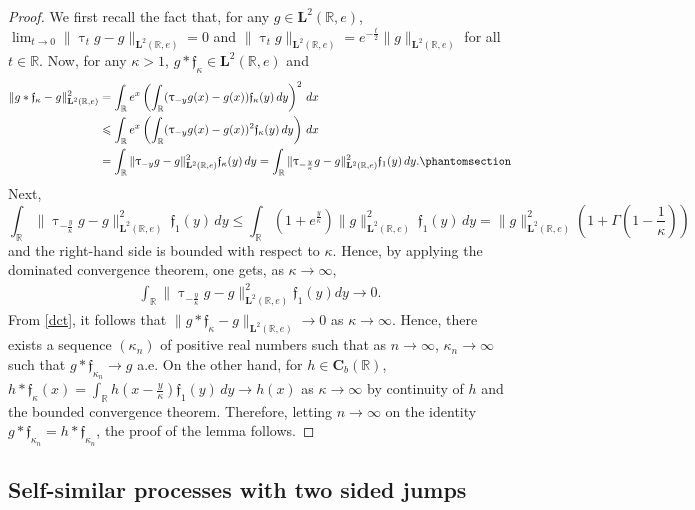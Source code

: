 \documentclass[12pt]{amsart}
\newcommand{\hlabel}{\phantomsection\label}
\numberwithin{equation}{section}
\newcommand{\bb}{\mathbb}
\renewcommand{\le}{\leqslant}
\newcommand{\hpt}[2]{#2}
\newcommand{\mf}{\mathfrak}
\newcommand{\bmrm}[2][2]{\mathbf{#2}^{#1}}
\newcommand{\C}{\mathbf{C}}
\newcommand{\LRe}{\bmrm{L}(\bb{R},e)}
\renewcommand{\tau}{\uptau}
\theoremstyle{definition}
\theoremstyle{assump}
\theoremstyle{remark}
\begin{document}
{\begin{proof}
We first recall the fact that, for any $g\in\bmrm{L}(\bb{R},e)$, $\lim_{t\to 0}\|\tau_tg-g\|_{\bmrm{L}(\bb R,e)}=0$ and $\hpt{R38}{\|\tau_t g\|_{\bmrm{L}(\bb{R},e)}=e^{-\frac{t}{2}}\|g\|_{\bmrm{L}(\bb{R},e)}}$ for all $t\in\bb{R}$. Now, for any $\kappa>1$, $g\ast\mf{f}_\kappa\in\bmrm{L}(\bb{R},e)$ and
\begin{align}
\|g\ast\mf{f}_\kappa-g\|^2_{\LRe}&=\int_\bb{R} e^x\left(\int_\bb{R}(\tau_{-y}g(x)-g(x))\mf{f}_\kappa(y)\,dy\right)^2\,dx \nonumber \\
&\le\int_\bb{R} e^x\left(\int_\bb{R}(\tau_{-y}g(x)-g(x))^2\mf{f}_\kappa(y)\,dy\right)\,dx \nonumber \\
&=\int_{\bb{R}}\|\tau_{-y}g-g\|^2_{\LRe}\mf{f}_\kappa(y)\,dy=\int_{\bb{R}}\|\tau_{-\frac{y}{\kappa}}g-g\|^2_{\LRe}\mf{f}_1(y)\,dy. \hlabel{dct}
\end{align}
Next,
$$\int_\bb{R}\|\tau_{-\frac{y}{\kappa}}g-g\|^2_{\LRe}\ \mf{f}_1(y)\,dy\le\int_\bb{R}(1+e^{\frac{y}{\kappa}})\|g\|^2_{\LRe}\ \mf{f}_1(y)\,dy=\|g\|^2_{\LRe}\left(1+\Gamma\left(1-\frac{1}{\kappa}\right)\right)$$
and the right-hand side is bounded with respect to $\kappa$. Hence, by applying the dominated convergence theorem, one gets,  as $\kappa\to\infty$,
\begin{align*}
\int_\bb{R} \|\tau_{-\frac{y}{\kappa}} g-g\|^2_{\bmrm{L}(\bb{R},e)}\mf{f}_1(y)dy\to 0.
\end{align*}
From \eqref{dct}, it follows that $\|g\ast\mf{f}_\kappa-g\|_{\bmrm{L}(\bb{R},e)}\to 0$ as $\kappa\to\infty$. Hence, there exists a sequence $(\kappa_n)$ of positive real numbers such that as $n \to \infty$, $\kappa_n\to\infty$ such that $g\ast\mf{f}_{\kappa_n}\to g$ a.e. On the other hand, for $h\in \C_b(\bb{R})$, $h\ast\mf{f}_\kappa(x)=\int_{\bb{R}}h(x-\frac{y}{\kappa})\mf{f}_1(y)\,dy\to h(x)$ as $\kappa\to\infty$ by continuity of $h$ and the bounded convergence theorem. Therefore, letting $n\to\infty$ on the identity $g\ast\mf{f}_{\kappa_n}=h\ast\mf{f}_{\kappa_n}$, the proof of the lemma follows.
\end{proof}


\subsection{Self-similar processes with two sided jumps}
}
\end{document}
